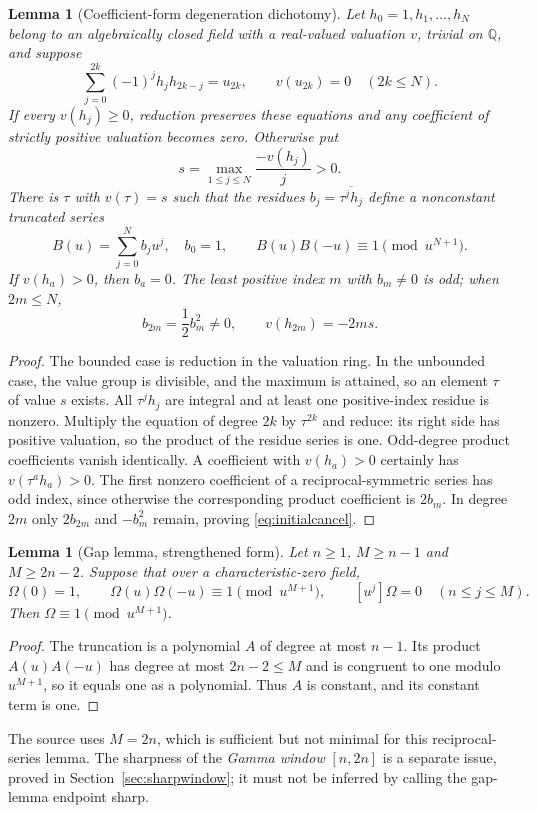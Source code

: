 \documentclass[11pt,a4paper]{article}
\newtheorem{lemma}[theorem]{Lemma}
\theoremstyle{definition}\newtheorem{definition}[theorem]{Definition}
\theoremstyle{remark}\newtheorem{remark}[theorem]{Remark}
\newcommand{\Q}{\mathbb Q}\newcommand{\Qb}{\overline{\mathbb Q}}
\begin{document}
\begin{lemma}[Coefficient-form degeneration dichotomy]\label{lem:valuation}
Let $h_0=1,h_1,\ldots,h_N$ belong to an algebraically closed field with a real-valued valuation $v$, trivial on $\Q$, and suppose
\[
\sum_{j=0}^{2k}(-1)^jh_jh_{2k-j}=u_{2k},\qquad v(u_{2k})=0\quad(2k\le N).
\]
If every $v(h_j)\ge0$, reduction preserves these equations and any coefficient of strictly positive valuation becomes zero. Otherwise put
\[
s=\max_{1\le j\le N}\frac{-v(h_j)}j>0.
\]
There is $\tau$ with $v(\tau)=s$ such that the residues $b_j=\overline{\tau^jh_j}$ define a nonconstant truncated series
\[
B(u)=\sum_{j=0}^N b_ju^j,\quad b_0=1,\qquad
B(u)B(-u)\equiv1\pmod{u^{N+1}}.
\]
If $v(h_a)>0$, then $b_a=0$. The least positive index $m$ with $b_m\ne0$ is odd; when $2m\le N$,
\begin{equation}\label{eq:initialcancel}
b_{2m}=\frac12b_m^2\ne0,\qquad v(h_{2m})=-2ms.
\end{equation}
\end{lemma}
\begin{proof}
The bounded case is reduction in the valuation ring. In the unbounded case, the value group is divisible, and the maximum is attained, so an element $\tau$ of value $s$ exists. All $\tau^jh_j$ are integral and at least one positive-index residue is nonzero. Multiply the equation of degree $2k$ by $\tau^{2k}$ and reduce: its right side has positive valuation, so the product of the residue series is one. Odd-degree product coefficients vanish identically. A coefficient with $v(h_a)>0$ certainly has $v(\tau^ah_a)>0$. The first nonzero coefficient of a reciprocal-symmetric series has odd index, since otherwise the corresponding product coefficient is $2b_m$. In degree $2m$ only $2b_{2m}$ and $-b_m^2$ remain, proving \eqref{eq:initialcancel}.
\end{proof}

\begin{lemma}[Gap lemma, strengthened form]\label{lem:gap}
Let $n\ge1$, $M\ge n-1$ and $M\ge2n-2$. Suppose that over a characteristic-zero field,
\[
\Omega(0)=1,\qquad \Omega(u)\Omega(-u)\equiv1\pmod{u^{M+1}},
\qquad [u^j]\Omega=0\quad(n\le j\le M).
\]
Then $\Omega\equiv1\pmod{u^{M+1}}$.
\end{lemma}
\begin{proof}
The truncation is a polynomial $A$ of degree at most $n-1$. Its product $A(u)A(-u)$ has degree at most $2n-2\le M$ and is congruent to one modulo $u^{M+1}$, so it equals one as a polynomial. Thus $A$ is constant, and its constant term is one.
\end{proof}
The source uses $M=2n$, which is sufficient but not minimal for this reciprocal-series lemma. The sharpness of the \emph{Gamma window} $[n,2n]$ is a separate issue, proved in Section~\ref{sec:sharpwindow}; it must not be inferred by calling the gap-lemma endpoint sharp.
\end{document}
